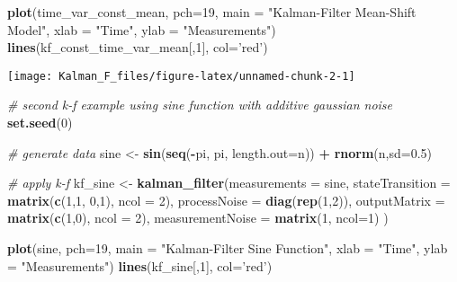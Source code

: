 \documentclass[
]{article}
\newenvironment{Shaded}{\begin{snugshade}}{\end{snugshade}}
\newcommand{\CommentTok}[1]{\textcolor[rgb]{0.56,0.35,0.01}{\textit{#1}}}
\newcommand{\DataTypeTok}[1]{\textcolor[rgb]{0.13,0.29,0.53}{#1}}
\newcommand{\DecValTok}[1]{\textcolor[rgb]{0.00,0.00,0.81}{#1}}
\newcommand{\FloatTok}[1]{\textcolor[rgb]{0.00,0.00,0.81}{#1}}
\newcommand{\KeywordTok}[1]{\textcolor[rgb]{0.13,0.29,0.53}{\textbf{#1}}}
\newcommand{\NormalTok}[1]{#1}
\newcommand{\OperatorTok}[1]{\textcolor[rgb]{0.81,0.36,0.00}{\textbf{#1}}}
\newcommand{\StringTok}[1]{\textcolor[rgb]{0.31,0.60,0.02}{#1}}
\begin{document}
\begin{Shaded}
\begin{Highlighting}[]
\KeywordTok{plot}\NormalTok{(time_var_const_mean, }\DataTypeTok{pch=}\DecValTok{19}\NormalTok{, }
    \DataTypeTok{main =} \StringTok{"Kalman-Filter Mean-Shift Model"}\NormalTok{,}
    \DataTypeTok{xlab =} \StringTok{"Time"}\NormalTok{,}
    \DataTypeTok{ylab =} \StringTok{"Measurements"}\NormalTok{)}
\KeywordTok{lines}\NormalTok{(kf_const_time_var_mean[,}\DecValTok{1}\NormalTok{], }\DataTypeTok{col=}\StringTok{'red'}\NormalTok{)}
\end{Highlighting}
\end{Shaded}

\begin{center}\texttt{[image: Kalman\_F\_files/figure-latex/unnamed-chunk-2-1]} \end{center}

\begin{Shaded}
\begin{Highlighting}[]
\CommentTok{# second k-f example using sine function with additive gaussian noise }
\KeywordTok{set.seed}\NormalTok{(}\DecValTok{0}\NormalTok{)}

\CommentTok{# generate data}
\NormalTok{sine <-}\StringTok{ }\KeywordTok{sin}\NormalTok{(}\KeywordTok{seq}\NormalTok{(}\OperatorTok{-}\NormalTok{pi, pi, }\DataTypeTok{length.out=}\NormalTok{n)) }\OperatorTok{+}\StringTok{ }\KeywordTok{rnorm}\NormalTok{(n,}\DataTypeTok{sd=}\FloatTok{0.5}\NormalTok{)}

\CommentTok{# apply k-f}
\NormalTok{kf_sine <-}\StringTok{ }\KeywordTok{kalman_filter}\NormalTok{(}\DataTypeTok{measurements =}\NormalTok{ sine, }\DataTypeTok{stateTransition =} \KeywordTok{matrix}\NormalTok{(}\KeywordTok{c}\NormalTok{(}\DecValTok{1}\NormalTok{,}\DecValTok{1}\NormalTok{, }\DecValTok{0}\NormalTok{,}\DecValTok{1}\NormalTok{), }\DataTypeTok{ncol =} \DecValTok{2}\NormalTok{), }\DataTypeTok{processNoise =} \KeywordTok{diag}\NormalTok{(}\KeywordTok{rep}\NormalTok{(}\DecValTok{1}\NormalTok{,}\DecValTok{2}\NormalTok{)), }
    \DataTypeTok{outputMatrix =} \KeywordTok{matrix}\NormalTok{(}\KeywordTok{c}\NormalTok{(}\DecValTok{1}\NormalTok{,}\DecValTok{0}\NormalTok{), }\DataTypeTok{ncol =} \DecValTok{2}\NormalTok{), }\DataTypeTok{measurementNoise =} \KeywordTok{matrix}\NormalTok{(}\DecValTok{1}\NormalTok{, }\DataTypeTok{ncol=}\DecValTok{1}\NormalTok{)}
\NormalTok{)}

\KeywordTok{plot}\NormalTok{(sine, }\DataTypeTok{pch=}\DecValTok{19}\NormalTok{, }
    \DataTypeTok{main =} \StringTok{"Kalman-Filter Sine Function"}\NormalTok{,}
    \DataTypeTok{xlab =} \StringTok{"Time"}\NormalTok{,}
    \DataTypeTok{ylab =} \StringTok{"Measurements"}\NormalTok{)}
\KeywordTok{lines}\NormalTok{(kf_sine[,}\DecValTok{1}\NormalTok{], }\DataTypeTok{col=}\StringTok{'red'}\NormalTok{)}
\end{Highlighting}
\end{Shaded}
\end{document}
